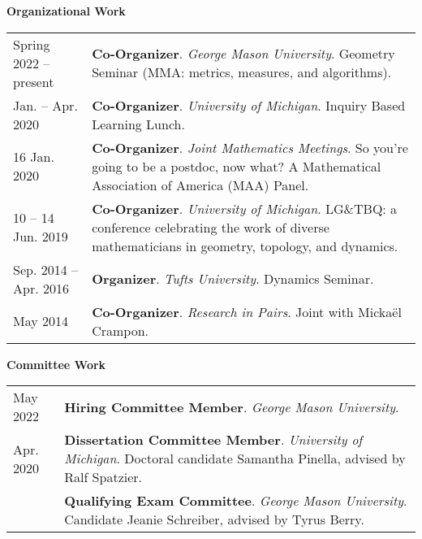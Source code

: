     \vspace{-1em}
    

    \textbf{\large Organizational Work}
    
    \begin{center}
    {
    \renewcommand{\arraystretch}{1.2}
    \begin{longtable}{p{}  p{}}
      Spring 2022 --    present & \textbf{Co-Organizer}. \textit{George Mason University}.  Geometry Seminar (MMA: metrics, measures, and algorithms).  \\ 
 Jan.  --  Apr.  2020 & \textbf{Co-Organizer}. \textit{University of Michigan}.  Inquiry Based Learning Lunch.  \\ 
16 Jan.  2020 & \textbf{Co-Organizer}. \textit{Joint Mathematics Meetings}.  So you're going to be a postdoc, now what? A Mathematical Association of America (MAA) Panel.  \\ 
10  -- 14 Jun.  2019 & \textbf{Co-Organizer}. \textit{University of Michigan}.  LG\&TBQ: a conference celebrating the work of diverse mathematicians
in geometry, topology, and dynamics.  \\ 
 Sep.  2014 --  Apr.  2016 & \textbf{Organizer}. \textit{Tufts University}.  Dynamics Seminar.  \\ 
 May  2014 & \textbf{Co-Organizer}. \textit{Research in Pairs}.  Joint with Micka\"el Crampon.  
    \end{longtable}
    } 
    \end{center}

    \vspace{-1em}
    

    \textbf{\large Committee Work}
    
    \begin{center}
    {
    \renewcommand{\arraystretch}{1.2}
    \begin{longtable}{p{}  p{}}
     May  2022 & \textbf{Hiring Committee Member}. \textit{George Mason University}.  \\ 
 Apr.  2020 & \textbf{Dissertation Committee Member}. \textit{University of Michigan}.  Doctoral candidate Samantha Pinella, advised by Ralf Spatzier.  \\ 
  & \textbf{Qualifying Exam Committee}. \textit{George Mason University}.  Candidate Jeanie Schreiber, advised by Tyrus Berry.  
    \end{longtable}
    } 
    \end{center}

    \vspace{-1em}
    


